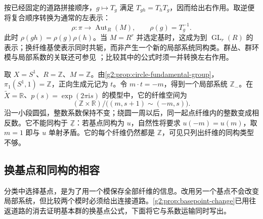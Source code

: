 按已经固定的道路拼接顺序，\(g\mapsto T_g\) 满足 \(T_{gh}=T_hT_g\)，因而给出右作用。取逆便将复合顺序转换为通常的左表示：
\begin{equation}\label{g2:eq:local-left-representation}
	\rho:\pi\longrightarrow\operatorname{Aut}_R(M),\qquad\rho(g)=T_g^{-1}.
\end{equation}
此时 \(\rho(gh)=\rho(g)\rho(h)\)。当 \(M=R^r\) 并选定基时，这成为到 \(\operatorname{GL}_r(R)\) 的表示；换纤维基使表示同时共轭，而非产生一个新的局部系统同构类。群丛、群环模与局部系数的关联还可参见 \cite[第3.H节]{Hatcher2002}；比较其中的公式时须一并转换左右作用。

\begin{example}\label{g2:exm:sign-local-system}
	取 \(X=S^1\)、\(R=\mathbb Z\)、\(M=\mathbb Z\)。由\cref{g2:prop:circle-fundamental-group}，\(\pi_1(S^1,1)=\mathbb Z\)，正向生成元记为 \(t\)。令 \(m\cdot t=-m\)，得到一个局部系统 \(\mathbb Z_-\)。在 \(\widetilde X=\mathbb R\)、\(p(s)=\exp(2\pi\mathrm{i}s)\) 的模型中，它的纤维空间为
	\[
		(\mathbb Z\times\mathbb R)/\bigl((m,s+1)\sim(-m,s)\bigr).
	\]
	沿一小段圆弧，整数系数保持不变；绕圆一周以后，同一起点纤维内的整数变成相反数。它不能同构于 \(\underline{\mathbb Z}\)：若基点同构为 \(u\)，自然性将要求 \(u(-m)=u(m)\)，取 \(m=1\) 即与 \(u\) 单射矛盾。它的每个纤维仍然都是 \(\mathbb Z\)，可见只列出纤维的同构类型不够。
\end{example}

\subsection{换基点和同构的相容}
\label{g2:subsec:0501:04}
分类中选择基点，是为了用一个模保存全部纤维的信息。改用另一个基点不会改变局部系统，但比较两个模时必须给出连接道路。\cref{g2:prop:basepoint-change}已用往返道路的消去证明基本群的换基点公式，下面将它与系数运输同时写出。

